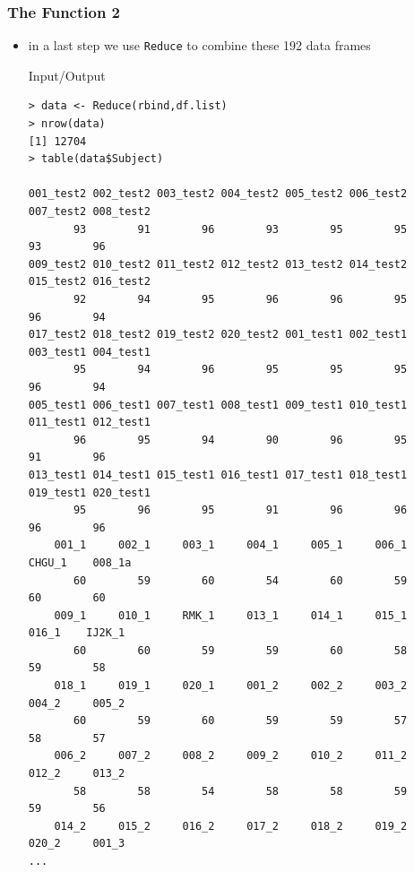 \documentclass[xcolor={table},c]{beamer}
\begin{document}
\begin{frame}[fragile]\frametitle{The Function 2}
  \begin{itemize}
  \item in a last step we use \texttt{Reduce{}} to combine these 192 data frames
    \begin{exampleblock}{Input/Output}\tiny
\begin{verbatim}
> data <- Reduce(rbind,df.list)
> nrow(data)
[1] 12704
> table(data$Subject)

001_test2 002_test2 003_test2 004_test2 005_test2 006_test2 007_test2 008_test2 
       93        91        96        93        95        95        93        96 
009_test2 010_test2 011_test2 012_test2 013_test2 014_test2 015_test2 016_test2 
       92        94        95        96        96        95        96        94 
017_test2 018_test2 019_test2 020_test2 001_test1 002_test1 003_test1 004_test1 
       95        94        96        95        95        95        96        94 
005_test1 006_test1 007_test1 008_test1 009_test1 010_test1 011_test1 012_test1 
       96        95        94        90        96        95        91        96 
013_test1 014_test1 015_test1 016_test1 017_test1 018_test1 019_test1 020_test1 
       95        96        95        91        96        96        96        96 
    001_1     002_1     003_1     004_1     005_1     006_1    CHGU_1    008_1a 
       60        59        60        54        60        59        60        60 
    009_1     010_1     RMK_1     013_1     014_1     015_1     016_1    IJ2K_1 
       60        60        59        59        60        58        59        58 
    018_1     019_1     020_1     001_2     002_2     003_2     004_2     005_2 
       60        59        60        59        59        57        58        57 
    006_2     007_2     008_2     009_2     010_2     011_2     012_2     013_2 
       58        58        54        58        58        59        59        56 
    014_2     015_2     016_2     017_2     018_2     019_2     020_2     001_3 
...
\end{verbatim}
    \end{exampleblock}
  \end{itemize}
\end{frame}
\end{document}
